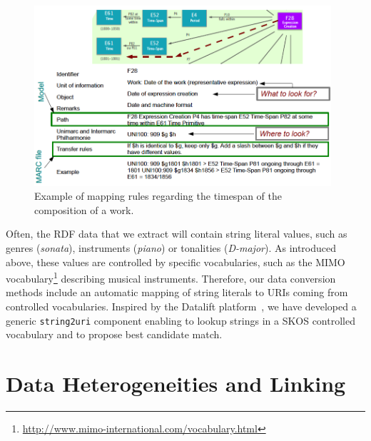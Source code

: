 \documentclass[runningheads,a4paper]{llncs}
\begin{document}
\begin{figure}
  \centering
  \includegraphics[width=11cm]{img/mapping-rules.png}
  \caption{Example of mapping rules regarding the timespan of the composition of a work.}
  \label{fig:mappings}
\end{figure}

Often, the RDF data that we extract will contain string literal values, such as genres ({\it sonata}), instruments ({\it piano}) or tonalities ({\it D-major}). As introduced above, these values are controlled by specific vocabularies, such as the MIMO vocabulary\footnote{\url{http://www.mimo-international.com/vocabulary.html}} describing musical instruments. Therefore, our data conversion methods include an automatic mapping of string literals to URIs coming from controlled vocabularies. Inspired by the Datalift platform~\cite{datalift}, we have developed a generic \texttt{string2uri} component enabling to lookup strings in a SKOS controlled vocabulary and to propose best candidate match.



\section{Data Heterogeneities and Linking}
\end{document}
